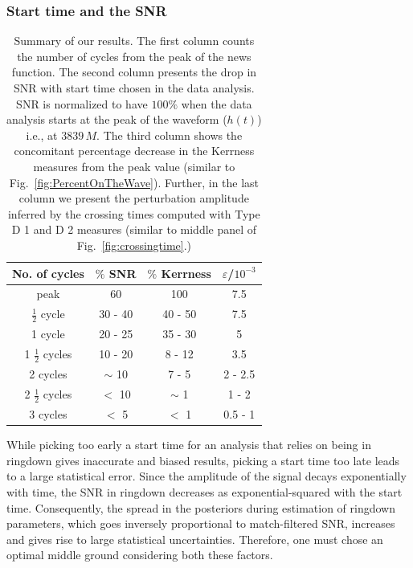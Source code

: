 \StrainsFigure

\subsubsection{Start time and the SNR}

\begin{table}[!htb]
 \begin{ruledtabular}
    \centering
        \begin{tabular}{ c| c | c | c}
No. of cycles & $\%$ SNR & $\%$ Kerrness & $\varepsilon $/$10^{-3}$ \\ \hline
peak  & 60 & 100 &  7.5\\
$\frac{1}{2}$ cycle & 30 - 40 & 40 - 50 &  7.5 \\
1 cycle & 20 - 25 & 35 - 30 &  5\\
1 $\frac{1}{2}$ cycles  & 10 - 20 & 8 - 12 &  3.5\\
2 cycles  &  $\sim$ 10 & 7 - 5 &  2 - 2.5 \\
2 $\frac{1}{2}$ cycles  &  $<$ 10  & $\sim$ 1 &  1 - 2 \\
3 cycles  & $<$  5 & $ <$ 1 &  0.5 - 1 \\
\end{tabular}
    \caption{Summary of our results. The first column counts the number of cycles from the peak of the news function. The second column presents the drop in SNR with start time chosen in the data analysis. SNR is normalized to have $100 \%$ when the data analysis starts at the peak of the waveform ($h(t)$) i.e., at $3839\,M$. The third column shows the concomitant percentage decrease in the Kerrness measures from the peak value (similar to Fig.~\ref{fig:PercentOnTheWave}). Further, in the last column we present the perturbation amplitude inferred by the crossing times computed with Type D 1 and D 2 measures (similar to middle panel of Fig.~\ref{fig:crossingtime}.) }
\label{tab:combined info}
 \end{ruledtabular}
\end{table}

\SNRdp
\spread

While picking too early a start time for an analysis that relies on being in ringdown gives inaccurate and biased results, picking a start time too late leads to a large statistical error. Since the amplitude of the signal decays exponentially with time, the SNR in ringdown decreases as exponential-squared with the start time. Consequently, the spread in the posteriors during estimation of ringdown parameters, which goes inversely proportional to match-filtered SNR, increases and gives rise to large statistical uncertainties. Therefore, one must chose an optimal middle ground considering both these factors. 

